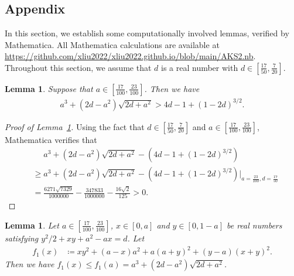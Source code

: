 \documentclass[11pt,a4paper]{article}
\newcommand{\at}[2][]{#1|_{#2}}
\newtheorem{lemma}[definition]{Lemma}
\begin{document}
\begin{appendix}
%
\section{Appendix}
%
In this section, we establish  some computationally involved lemmas, verified by Mathematica. 
All Mathematica calculations are available at \url{https://github.com/xliu2022/xliu2022.github.io/blob/main/AKS2.nb}. 
Throughout this section, we assume that $d$ is a real number with $d \in \left[\tfrac{17}{50}, \tfrac{7}{20}\right]$. 

\begin{lemma}\label{LEM:alpha-inequality-star-two-upper-bounds}
    Suppose that $a \in \left[\tfrac{17}{100}, \tfrac{23}{100} \right]$. 
    Then we have 
    \begin{align*}
        a^3+(2d-a^2) \sqrt{2d+a^2} 
        > 4d -1 +(1-2d)^{3/2}.  
    \end{align*}
\end{lemma}

\begin{proof}[Proof of Lemma~\ref{LEM:alpha-inequality-star-two-upper-bounds}]
Using the fact that $d \in \left[\tfrac{17}{50}, \tfrac{7}{20}\right]$ and $a \in \left[\tfrac{17}{100}, \tfrac{23}{100} \right]$, Mathematica verifies that 
\begin{align*}
& \quad \, \, a^3+(2d-a^2) \sqrt{2d+a^2} -\left(4d -1 +(1-2d)^{3/2}\right) \\
& \ge  a^3+(2d-a^2) \sqrt{2d+a^2} -\left(4d -1 +(1-2d)^{3/2}\right) \at{a = \frac{23}{100}, d=\frac{17}{50}}\\
& = \frac{6271 \sqrt{7329}}{1000000} - \frac{347833}{1000000}-\frac{16\sqrt{2}}{125} 
> 0. 
\end{align*}
\end{proof}


\begin{lemma}\label{Lem:Appe-calculation_1}
Let $a \in \left[\tfrac{17}{100}, \tfrac{23}{100}\right]$, $x \in \left[0,a\right]$ and $y \in \left[0,1-a \right]$ be real numbers satisfying 
$ y^2/2 + xy + a^2 - a x = d$. 
Let 
\begin{align*}
f_1(x) & \coloneqq xy^2 + (a-x)a^2 + a(a+y)^2+(y-a)(x+y)^2. 
\end{align*}
Then we have $f_1(x) \le f_1(a) = a^3 + (2d-a^2)\sqrt{2d+a^2}$.
\end{lemma}


\end{appendix}
\end{document}
